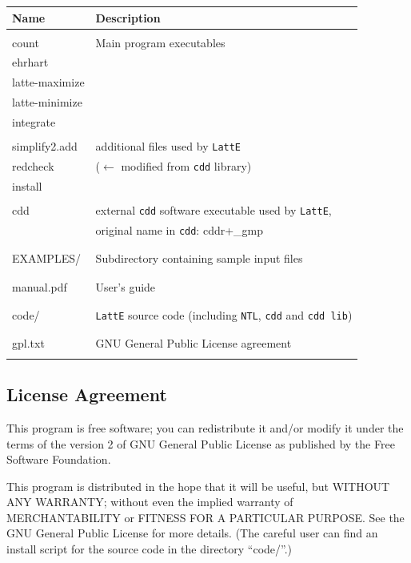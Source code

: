 \documentclass{article}
\begin{document}
\begin{tabular}{|l|l|}
\hline
Name & Description\\
\hline 
& \\
count & Main program executables\\
ehrhart & \\
latte-maximize & \\
latte-minimize & \\
integrate      & \\
& \\

simplify2.add & additional files used by {\tt LattE}\\
redcheck & ($\leftarrow$ modified from {\tt cdd} library) \\
install & \\
& \\
cdd & external {\tt cdd} software executable used by {\tt LattE},\\
& original name in {\tt cdd}: cddr+\_gmp\\
& \\
\hline
& \\
EXAMPLES/ & Subdirectory containing sample input files\\
& \\
\hline
& \\
manual.pdf & User's guide \\
& \\
\hline 
& \\
code/ & {\tt LattE} source code (including {\tt NTL}, {\tt cdd} and {\tt cdd lib})\\
& \\
\hline 
& \\
gpl.txt & GNU General Public License agreement\\
& \\
\hline 
\end{tabular}

\subsection{License Agreement}

This program is free software; you can redistribute it and/or
modify it under the terms of the version 2 of GNU General Public
License as published by the Free Software Foundation.

This program is distributed in the hope that it will be useful,
but WITHOUT ANY WARRANTY; without even the implied warranty of
MERCHANTABILITY or FITNESS FOR A PARTICULAR PURPOSE. See the GNU
General Public License for more details. (The careful user can find
an install script for the source code in the directory ``code/''.)
\end{document}
